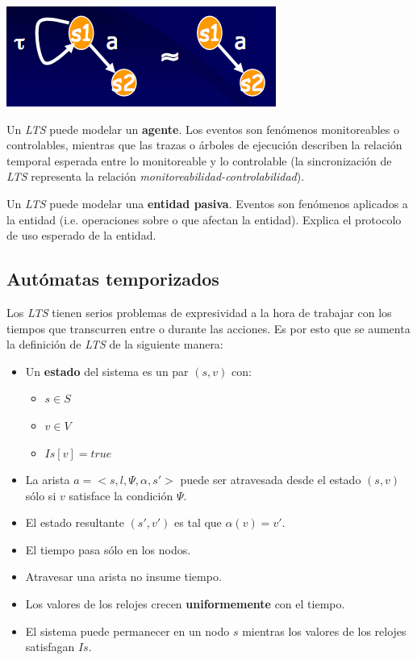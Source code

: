 \documentclass[]{article}
\begin{document}
\begin{center}
	\includegraphics[scale=0.5]{LoopTau.png}
\end{center}

Un \textit{LTS} puede modelar un \textbf{agente}. Los eventos son fenómenos monitoreables o controlables, mientras que las trazas o árboles de ejecución describen la relación temporal esperada entre lo monitoreable y lo controlable (la sincronización de \textit{LTS} representa la relación \textit{monitoreabilidad-controlabilidad}).

Un \textit{LTS} puede modelar una \textbf{entidad pasiva}. Eventos son fenómenos aplicados a la entidad (i.e. operaciones sobre o que afectan la entidad). Explica el protocolo de uso esperado de la entidad.


\subsection{Autómatas temporizados}
Los \textit{LTS} tienen serios problemas de expresividad a la hora de trabajar con los tiempos que transcurren entre o durante las acciones. Es por esto que se aumenta la definición de \textit{LTS} de la siguiente manera:
\begin{itemize}
	\item Un \textbf{estado} del sistema es un par $(s,v)$ con:
	\begin{itemize}
		\item $s\in S$
		\item $v\in V$
		\item $Is[v] = true$
	\end{itemize}
	\item La arista $a = <s,l,\Psi,\alpha,s'>$ puede ser atravesada desde el estado $(s,v)$ sólo si $v$ satisface la condición $\Psi$.
	\item El estado resultante $(s',v')$ es tal que $\alpha(v) = v'$.
	\item El tiempo pasa sólo en los nodos.
	\item Atravesar una arista no insume tiempo.
	\item Los valores de los relojes crecen \textbf{uniformemente} con el tiempo.
	\item El sistema puede permanecer en un nodo $s$ mientras los valores de los relojes satisfagan $Is$.
\end{itemize}
\end{document}
